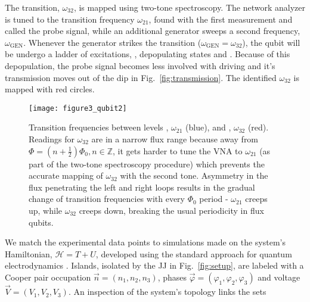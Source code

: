 The \ilra{}  transition, $\omega_{32}$,  is mapped  using two-tone  spectroscopy. The
network  analyzer is  tuned to  the transition  frequency  $ \omega_{21}  $, found  with the  first
measurement  and called  the  probe signal,  while  an additional  generator  sweeps a  second
frequency,  $  \omega_{\text{GEN}} $.   Whenever  the  generator strikes  the  \ira{}
transition ($\omega_{\text{GEN}} =  \omega_{32} $), the qubit  will be undergo a  ladder of excitations,
    , depopulating states 
and  .  Because  of this  depopulation, the  probe signal  becomes less  involved with
driving  and it's  transmission  moves out  of the  dip  in Fig.~\ref{fig:transmission}.   The
identified $\omega_{32}$ is mapped with red circles.



\begin{figure}[h]
  \texttt{[image: figure3\_qubit2]}
  \caption{\small    Transition   frequencies    between   levels    \ilra   {},
    $  \omega_{21}  $  (blue),  and    \ilra  {},  $  \omega_{32}$  (red).   Readings  for
    $    \omega_{32}    $     are    in    a    narrow    flux    range     because    away    from
    $  \Phi  =  (n +  \frac{1}{2})\Phi_0,  n\in\mathbb{Z}  $,  it  gets  harder  to tune  the  VNA  to
    $ \omega_{21} $  (as part of the  two-tone spectroscopy procedure) which  prevents the accurate
    mapping of $  \omega_{32} $ with the second  tone.  Asymmetry in the flux  penetrating the left
    and  right loops  results  in the  gradual  change of  transition  frequencies with  every
    $ \Phi_{0}  $ period -  $\omega_{21}$ creeps  up, while $\omega_{32}$  creeps down, breaking  the usual
    periodicity in flux qubits.}
  \label{fig:experiment}
\end{figure}

We  match the  experimental  data points  to  simulations made  on  the system's  Hamiltonian,
$ \mathcal{H}  = T + U  $, developed using  the standard approach for  quantum electrodynamics
\cite{orlando1999}.  Islands, isolated  by the JJ in Fig.~\ref{fig:setup}, are  labeled with a
Cooper    pair     occupation    $     \vec{n}    =    (n_1,     n_2,    n_3)     $,    phases
$        \vec{\varphi}       =        (\varphi_1,        \varphi_2,       \varphi_3)        $       and        voltage
$ \vec{V} = \left(V_{1}, V_{2}, V_{3}\right) $.   An inspection of the system's topology links
the sets

